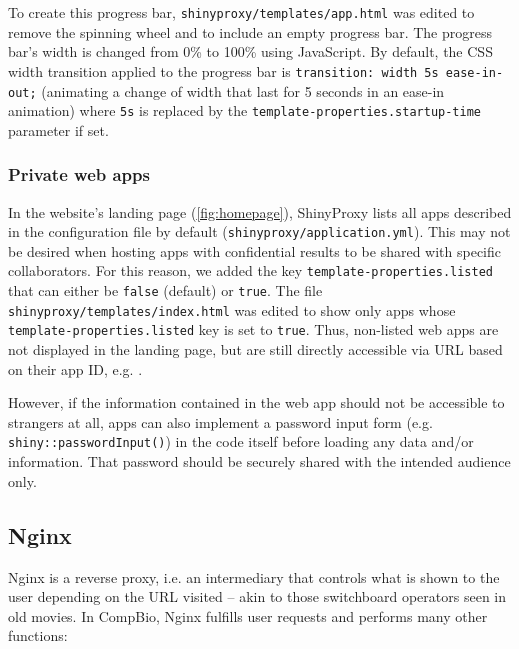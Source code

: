 To create this progress bar, \verb|shinyproxy/templates/app.html| was edited to remove the spinning wheel and to include an empty progress bar. The progress bar's width is changed from 0\% to 100\% using JavaScript. By default, the CSS width transition applied to the progress bar is \texttt{transition: width 5s ease-in-out;} (animating a change of width that last for 5 seconds in an ease-in animation) where \texttt{5s} is replaced by the \texttt{template-properties.startup-time} parameter if set.



\subsubsection{Private web apps}

In the website's landing page (\autoref{fig:homepage}), ShinyProxy lists all apps described in the configuration file by default (\texttt{shinyproxy/application.yml}). This may not be desired when hosting apps with confidential results to be shared with specific collaborators. For this reason, we added the key \texttt{template-properties.listed} that can either be \texttt{false} (default) or \texttt{true}. The file \texttt{shinyproxy/templates/index.html} was edited to show only apps whose \texttt{template-properties.listed} key is set to \texttt{true}. Thus, non-listed web apps are not displayed in the landing page, but are still directly accessible via URL based on their app ID, e.g. .

However, if the information contained in the web app should not be accessible to strangers at all, apps can also implement a password input form (e.g. \texttt{shiny::passwordInput()}) in the code itself before loading any data and/or information. That password should be securely shared with the intended audience only.

\subsection{Nginx}

Nginx is a reverse proxy, i.e. an intermediary that controls what is shown to the user depending on the URL visited -- akin to those switchboard operators seen in old movies. In CompBio, Nginx fulfills user requests and performs many other functions:

